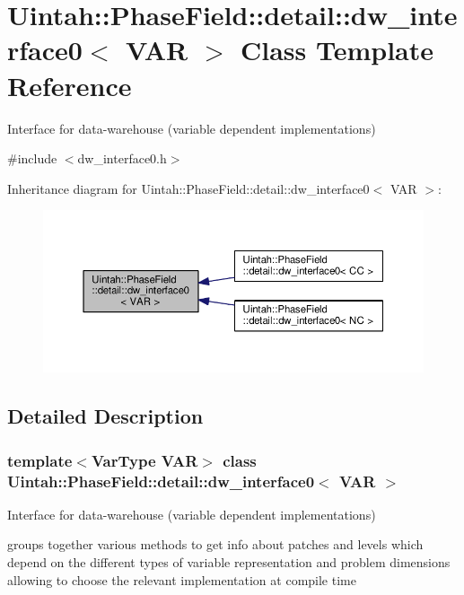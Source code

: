 \hypertarget{classUintah_1_1PhaseField_1_1detail_1_1dw__interface0}{}\section{Uintah\+:\+:Phase\+Field\+:\+:detail\+:\+:dw\+\_\+interface0$<$ V\+AR $>$ Class Template Reference}
\label{classUintah_1_1PhaseField_1_1detail_1_1dw__interface0}


Interface for data-\/warehouse (variable dependent implementations)  




{\ttfamily \#include $<$dw\+\_\+interface0.\+h$>$}



Inheritance diagram for Uintah\+:\+:Phase\+Field\+:\+:detail\+:\+:dw\+\_\+interface0$<$ V\+AR $>$\+:\nopagebreak
\begin{figure}[H]
\begin{center}
\leavevmode
\includegraphics[width=350pt]{classUintah_1_1PhaseField_1_1detail_1_1dw__interface0__inherit__graph}
\end{center}
\end{figure}


\subsection{Detailed Description}
\subsubsection*{template$<$Var\+Type V\+AR$>$\newline
class Uintah\+::\+Phase\+Field\+::detail\+::dw\+\_\+interface0$<$ V\+A\+R $>$}

Interface for data-\/warehouse (variable dependent implementations) 

groups together various methods to get info about patches and levels which depend on the different types of variable representation and problem dimensions allowing to choose the relevant implementation at compile time


